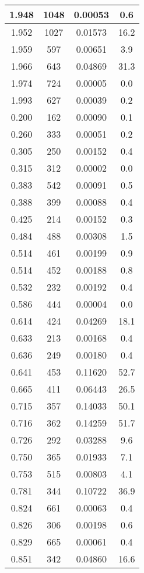 \begin{longtable}{c | c | c | c}
1.948 & 1048 & 0.00053 &  0.6 \\ \hline 
1.952 & 1027 & 0.01573 & 16.2 \\ \hline 
1.959 &  597 & 0.00651 &  3.9 \\ \hline 
1.966 &  643 & 0.04869 & 31.3 \\ \hline 
1.974 &  724 & 0.00005 &  0.0 \\ \hline 
1.993 &  627 & 0.00039 &  0.2 \\ \hline 
0.200 &  162 & 0.00090 &  0.1 \\ \hline 
0.260 &  333 & 0.00051 &  0.2 \\ \hline 
0.305 &  250 & 0.00152 &  0.4 \\ \hline 
0.315 &  312 & 0.00002 &  0.0 \\ \hline 
0.383 &  542 & 0.00091 &  0.5 \\ \hline 
0.388 &  399 & 0.00088 &  0.4 \\ \hline 
0.425 &  214 & 0.00152 &  0.3 \\ \hline 
0.484 &  488 & 0.00308 &  1.5 \\ \hline 
0.514 &  461 & 0.00199 &  0.9 \\ \hline 
0.514 &  452 & 0.00188 &  0.8 \\ \hline 
0.532 &  232 & 0.00192 &  0.4 \\ \hline 
0.586 &  444 & 0.00004 &  0.0 \\ \hline 
0.614 &  424 & 0.04269 & 18.1 \\ \hline 
0.633 &  213 & 0.00168 &  0.4 \\ \hline 
0.636 &  249 & 0.00180 &  0.4 \\ \hline 
0.641 &  453 & 0.11620 & 52.7 \\ \hline 
0.665 &  411 & 0.06443 & 26.5 \\ \hline 
0.715 &  357 & 0.14033 & 50.1 \\ \hline 
0.716 &  362 & 0.14259 & 51.7 \\ \hline 
0.726 &  292 & 0.03288 &  9.6 \\ \hline 
0.750 &  365 & 0.01933 &  7.1 \\ \hline 
0.753 &  515 & 0.00803 &  4.1 \\ \hline 
0.781 &  344 & 0.10722 & 36.9 \\ \hline 
0.824 &  661 & 0.00063 &  0.4 \\ \hline 
0.826 &  306 & 0.00198 &  0.6 \\ \hline 
0.829 &  665 & 0.00061 &  0.4 \\ \hline 
0.851 &  342 & 0.04860 & 16.6 \\ \hline 

\end{longtable}
